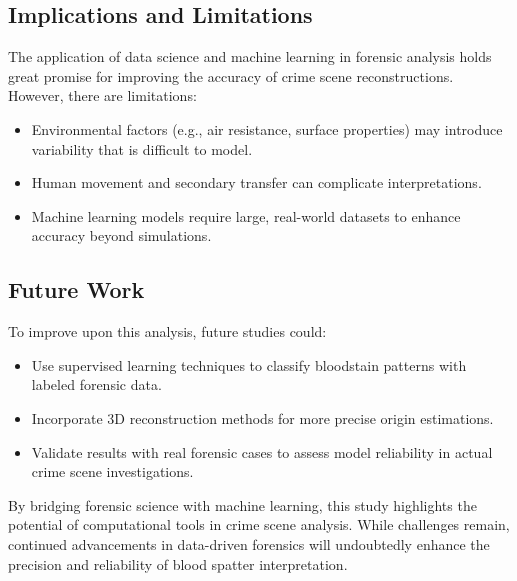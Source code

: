 \documentclass[11pt]{article}
\providecommand{\tightlist}{%
      \setlength{\itemsep}{0pt}\setlength{\parskip}{0pt}}
\begin{document}
\subsection{Implications and
Limitations}\label{implications-and-limitations}

The application of data science and machine learning in forensic
analysis holds great promise for improving the accuracy of crime scene
reconstructions. However, there are limitations:

\begin{itemize}
\tightlist
\item
  Environmental factors (e.g., air resistance, surface properties) may
  introduce variability that is difficult to model.
\item
  Human movement and secondary transfer can complicate interpretations.
\item
  Machine learning models require large, real-world datasets to enhance
  accuracy beyond simulations.
\end{itemize}

\subsection{Future Work}\label{future-work}

To improve upon this analysis, future studies could:

\begin{itemize}
\tightlist
\item
  Use supervised learning techniques to classify bloodstain patterns
  with labeled forensic data.
\item
  Incorporate 3D reconstruction methods for more precise origin
  estimations.
\item
  Validate results with real forensic cases to assess model reliability
  in actual crime scene investigations.
\end{itemize}

By bridging forensic science with machine learning, this study
highlights the potential of computational tools in crime scene analysis.
While challenges remain, continued advancements in data-driven forensics
will undoubtedly enhance the precision and reliability of blood spatter
interpretation.


    
    
    
\end{document}
